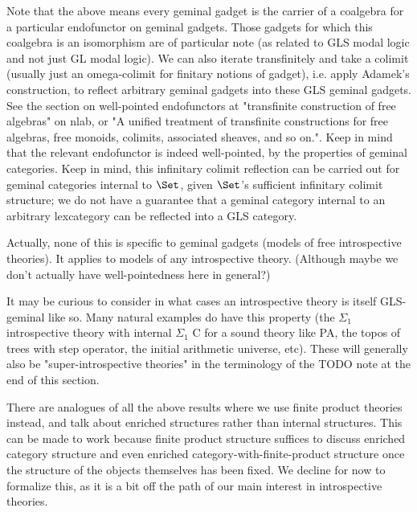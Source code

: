 \begin{TODOblock}
Note that the above means every geminal gadget is the carrier of a coalgebra for a particular endofunctor on geminal gadgets. Those gadgets for which this coalgebra is an isomorphism are of particular note (as related to GLS modal logic and not just GL modal logic). We can also iterate transfinitely and take a colimit (usually just an omega-colimit for finitary notions of gadget), i.e. apply Adamek's construction, to reflect arbitrary geminal gadgets into these GLS geminal gadgets. See the section on well-pointed endofunctors at "transfinite construction of free algebras" on nlab, or "A unified treatment of transfinite constructions for free algebras, free monoids, colimits, associated sheaves, and so on.". Keep in mind that the relevant endofunctor is indeed well-pointed, by the properties of geminal categories. Keep in mind, this infinitary colimit reflection can be carried out for geminal categories internal to $\Set$, given $\Set$'s sufficient infinitary colimit structure; we do not have a guarantee that a geminal category internal to an arbitrary lexcategory can be reflected into a GLS category.

Actually, none of this is specific to geminal gadgets (models of free introspective theories). It applies to models of any introspective theory. (Although maybe we don't actually have well-pointedness here in general?)

It may be curious to consider in what cases an introspective theory is itself GLS-geminal like so. Many natural examples do have this property (the $\Sigma_1$ introspective theory with internal $\Sigma_1$ C for a sound theory like PA, the topos of trees with step operator, the initial arithmetic universe, etc). These will generally also be "super-introspective theories" in the terminology of the TODO note at the end of this section.
\end{TODOblock}

There are analogues of all the above results where we use finite product theories instead, and talk about enriched structures rather than internal structures. This can be made to work because finite product structure suffices to discuss enriched category structure and even enriched category-with-finite-product structure once the structure of the objects themselves has been fixed. We decline for now to formalize this, as it is a bit off the path of our main interest in introspective theories. 


